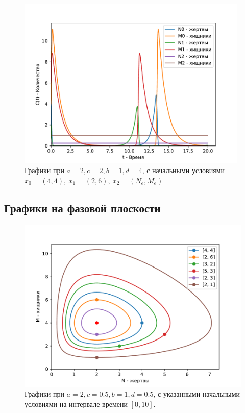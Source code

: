         \begin{figure}[H]
            \centering
            \includegraphics[width=11cm]{pictures/population2.pdf}
            \caption{Графики при $a = 2, c = 2, b = 1, d = 4$, с начальными условиями $x_0=(4,4), ~ x_1 = (2,6), ~ x_2 = (N_e, M_e)$}
        \end{figure}

    
    \subsection{Графики на фазовой плоскости}
        \begin{figure}[H]
            \centering
            \includegraphics[width=12cm]{pictures/population3.pdf}
            \caption{Графики при $a = 2, c = 0.5, b = 1, d = 0.5$, с указанными начальными условиями на интервале времени $ [0, 10] $.}
        \end{figure}

